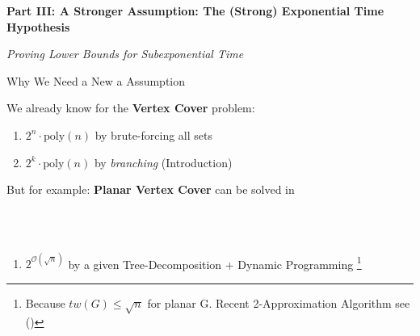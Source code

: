 \begin{frame}[c]{}
\begin{center}
    \textbf{Part III: A Stronger Assumption: The (Strong) Exponential Time Hypothesis}
    
    \textit{Proving Lower Bounds for Subexponential Time}
\end{center}
\end{frame}


\begin{frame}[c]{Why We Need a New a Assumption}

\begin{center}
We already know for the \textbf{Vertex Cover} problem:

\begin{enumerate}
    \pause\item $2^n \cdot \mathrm{poly}(n)$ by brute-forcing all sets
    \pause\item $2^k \cdot \mathrm{poly}(n)$ by \textit{branching} (Introduction)
\end{enumerate}

But for example: \textbf{Planar Vertex Cover} can be solved in 

\\~

\begin{enumerate}
    \pause\item $2^{\mathcal{O}(\sqrt{n})}$ by a given Tree-Decomposition + Dynamic Programming \footnote{Because $tw(G)\leq\sqrt{n}$ for planar G. Recent 2-Approximation Algorithm see (\cite{twapprox})}
\end{enumerate}
\end{center}

\end{frame}
